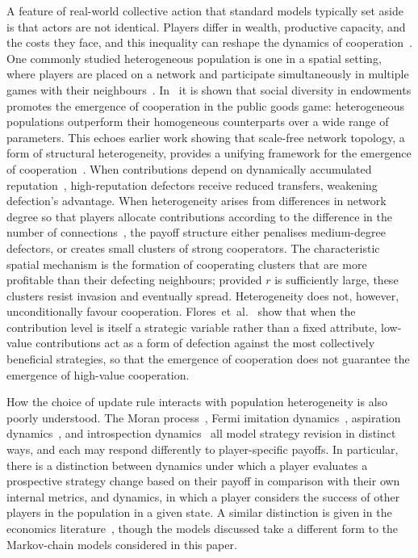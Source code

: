 \documentclass{article}
\begin{document}
A feature of real-world collective action that standard models typically set
aside is that actors are not identical. Players differ in wealth, productive
capacity, and the costs they face, and this inequality can reshape the dynamics
of cooperation~\cite{hauser2019social}. One commonly studied heterogeneous
population is one in a spatial setting, where players are placed on a network
and participate simultaneously in multiple games with their
neighbours~\cite{nowak1992evolutionary,
perc2013evolutionary,szabo2007evolutionary}. In~\cite{santos2008social} it is
shown that social diversity in endowments promotes the emergence of cooperation
in the public goods game: heterogeneous populations outperform their homogeneous
counterparts over a wide range of parameters. This echoes earlier work showing
that scale-free network topology, a form of structural heterogeneity, provides a
unifying framework for the emergence of cooperation~\cite{santos2005scale}. When
contributions depend on dynamically accumulated reputation~\cite{MA2021111353},
high-reputation defectors receive reduced transfers, weakening defection's
advantage. When heterogeneity arises from differences in network degree so that
players allocate contributions according to the difference in the number of
connections~\cite{LEI20104708}, the payoff structure either penalises
medium-degree defectors, or creates small clusters of strong cooperators. The
characteristic spatial mechanism is the formation of cooperating clusters that
are more profitable than their defecting neighbours; provided \(r\) is
sufficiently large, these clusters resist invasion and eventually spread.
Heterogeneity does not, however, unconditionally favour cooperation.
Flores~et~al.~\cite{PhysRevE.108.024111} show that when the contribution level
is itself a strategic variable rather than a fixed attribute, low-value
contributions act as a form of defection against the most collectively
beneficial strategies, so that the emergence of cooperation does not guarantee
the emergence of high-value cooperation.

How the choice of update rule interacts with population heterogeneity is also
poorly understood. The Moran process~\cite{knight2018evolution,Moran_1958},
Fermi imitation dynamics~\cite{PhysRevE.58.69}, aspiration
dynamics~\cite{du2014aspiration}, and introspection dynamics~\cite{Couto2022,
Couto2023} all model strategy revision in distinct ways, and each may respond
differently to player-specific payoffs. In particular, there is a distinction
between dynamics under which a player evaluates a prospective strategy change
based on their payoff in comparison with their own internal metrics, and
dynamics, in which a player considers the success of other players in the
population in a given state. A similar distinction is given in the economics
literature~\cite{bergin_comparative_2004}, though the models discussed take a
different form to the Markov-chain models considered in this paper.
\end{document}
